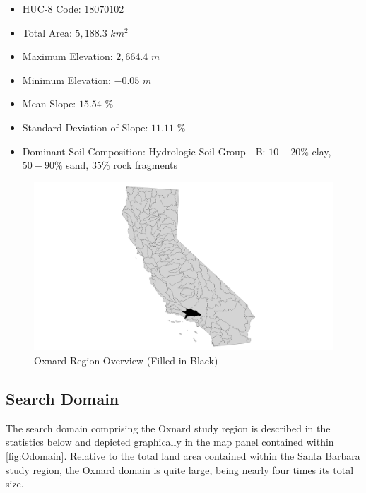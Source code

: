     \begin{itemize}
      \setlength{\itemsep}{0cm}
      \setlength{\parskip}{0cm}
        \item HUC-8 Code: $18070102$
        \item Total Area: $5,188.3$ $km^2$
        \item Maximum Elevation: $2,664.4$ $m$
        \item Minimum Elevation: $-0.05$ $m$
        \item Mean Slope: $15.54$ $\%$
        \item Standard Deviation of Slope: $11.11$ $\%$
        \item Dominant Soil Composition: Hydrologic Soil Group - B: $10-20\%$ clay, $50-90\%$ sand, $35\%$ rock fragments
    \end{itemize}
    
        \begin{figure}[!h]
            \begin{center}
            \includegraphics[width=5.5in]{figures/Oxnard_Overview.png}   
            \caption{Oxnard Region Overview (Filled in Black)}
            \label{fig:Ooverview}
            \end{center}
        \end{figure}

    \subsection{Search Domain}
    
The search domain comprising the Oxnard study region is described in the statistics below and depicted graphically in the map panel contained within \ref{fig:Odomain}. Relative to the total land area contained within the Santa Barbara study region, the Oxnard domain is quite large, being nearly four times its total size. 
    
